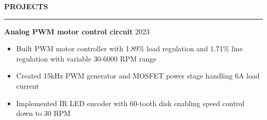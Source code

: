 \documentclass[notitlepage,10pt,a4paper]{article}
\newenvironment{resumesection}[1]{
    \header{#1}
}{}
\newcommand{\header}[1]{
    \vspace{2pt}
    \textcolor{accent1}{\Large \textbf{#1}}
    \vspace{6pt}\hrule\vspace{4pt}
}
\newcommand{\TECH}{
    \textcolor{accent3}{\small\textbf{SKILLS}}\small\,
}
\newcommand{\thingsep}{
    \vspace{4pt}
}
\newcommand{\LINK}[2]{
    \href{#1}{\textbf{#2}\,\,{\small\faExternalLink}}
}
\begin{document}
\begin{resumesection}{PROJECTS}
    \raggedright
    \textcolor{accent2}{\textbf{\large Analog PWM motor control circuit}} \hfill {2023} \\
    {\small\begin{itemize}[noitemsep, font=\small, label={-}, leftmargin=*, topsep=0pt, partopsep=0pt]
        \item Built PWM motor controller with 1.89\% load regulation and 1.71\% line regulation with variable 30-6000 RPM range
        \item Created 15kHz PWM generator and MOSFET power stage handling 6A load current
        \item Implemented IR LED encoder with 60-tooth disk enabling speed control down to 30 RPM
    \end{itemize}}
    \thingsep

    

\end{resumesection}
\end{document}
